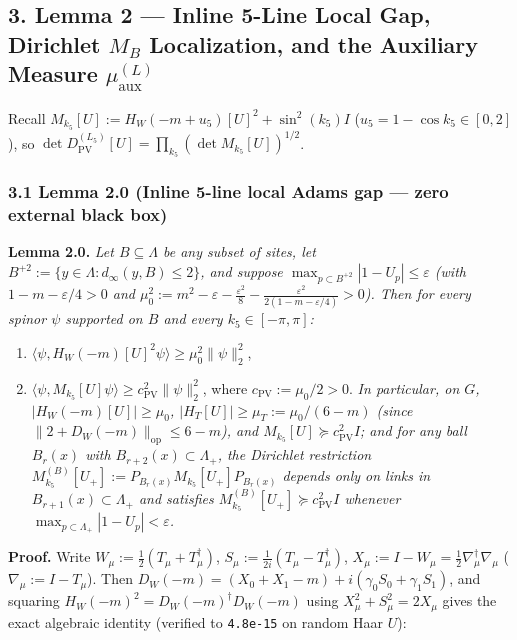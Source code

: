 \documentclass[11pt,a4paper]{article}
\begin{document}
\subsection*{3. Lemma 2 --- Inline 5-Line Local Gap, Dirichlet $M_B$ Localization, and the Auxiliary Measure $\mu_{\text{aux}}^{(L)}$}
Recall $M_{k_5}[U] := H_W(-m + u_5)[U]^2 + \sin^2(k_5) I$ ($u_5 = 1 - \cos k_5 \in [0, 2]$), so $\det D_{\text{PV}}^{(L_5)}[U] = \prod_{k_5} (\det M_{k_5}[U])^{1/2}$.


\subsubsection*{3.1 Lemma 2.0 (Inline 5-line local Adams gap --- zero external black box)}
{\bfseries\boldmath Lemma 2.0.} \emph{Let $B \subseteq \Lambda$ be any subset of sites, let $B^{+2} := \{y \in \Lambda : d_\infty(y, B) \le 2\}$, and suppose $\max_{p \subset B^{+2}} |1 - U_p| \le \varepsilon$ (with $1 - m - \varepsilon/4 > 0$ and $\mu_0^2 := m^2 - \varepsilon - \frac{\varepsilon^2}{8} - \frac{\varepsilon^2}{2(1 - m - \varepsilon/4)} > 0$). Then for every spinor $\psi$ supported on $B$ and every $k_5 \in [-\pi, \pi]$:}

\begin{enumerate}
\item{} $\langle \psi, H_W(-m)[U]^2 \psi \rangle \ge \mu_0^2 \|\psi\|_2^2$,
\item{} $\langle \psi, M_{k_5}[U] \psi \rangle \ge c_{\text{PV}}^2 \|\psi\|_2^2$, where $c_{\text{PV}} := \mu_0 / 2 > 0$.
\emph{In particular, on $G$, $|H_W(-m)[U]| \ge \mu_0$, $|H_T[U]| \ge \mu_T := \mu_0 / (6 - m)$ (since $\|2 + D_W(-m)\|_{\text{op}} \le 6 - m$), and $M_{k_5}[U] \succeq c_{\text{PV}}^2 I$; and for any ball $B_r(x)$ with $B_{r+2}(x) \subset \Lambda_+$, the Dirichlet restriction $M_{k_5}^{(B)}[U_+] := P_{B_r(x)} M_{k_5}[U_+] P_{B_r(x)}$ depends only on links in $B_{r+1}(x) \subset \Lambda_+$ and satisfies $M_{k_5}^{(B)}[U_+] \succeq c_{\text{PV}}^2 I$ whenever $\max_{p \subset \Lambda_+} |1 - U_p| < \varepsilon$.}
\end{enumerate}

{\bfseries\boldmath Proof.} Write $W_\mu := \frac{1}{2}(T_\mu + T_\mu^\dagger)$, $S_\mu := \frac{1}{2i}(T_\mu - T_\mu^\dagger)$, $X_\mu := I - W_\mu = \frac{1}{2} \nabla_\mu^\dagger \nabla_\mu$ ($\nabla_\mu := I - T_\mu$). Then $D_W(-m) = (X_0 + X_1 - m) + i(\gamma_0 S_0 + \gamma_1 S_1)$, and squaring $H_W(-m)^2 = D_W(-m)^\dagger D_W(-m)$ using $X_\mu^2 + S_\mu^2 = 2 X_\mu$ gives the exact algebraic identity (verified to \texttt{4.8e-15} on random Haar $U$):
\end{document}
